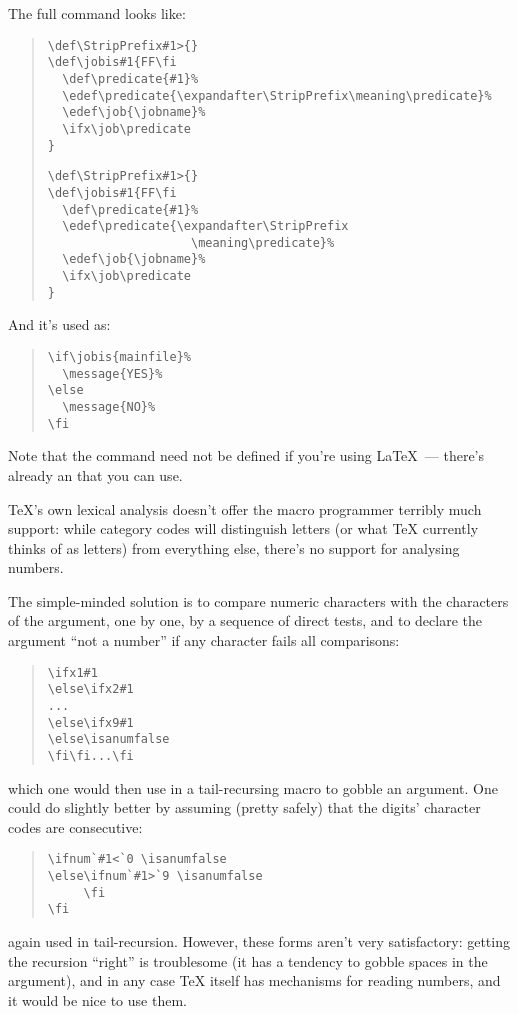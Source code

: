 The full command looks like:
\begin{quote}
\begin{wideversion}
\begin{verbatim}
\def\StripPrefix#1>{}
\def\jobis#1{FF\fi
  \def\predicate{#1}%
  \edef\predicate{\expandafter\StripPrefix\meaning\predicate}%
  \edef\job{\jobname}%
  \ifx\job\predicate
}
\end{verbatim}
\end{wideversion}
\begin{narrowversion}
\begin{verbatim}
\def\StripPrefix#1>{}
\def\jobis#1{FF\fi
  \def\predicate{#1}%
  \edef\predicate{\expandafter\StripPrefix
                    \meaning\predicate}%
  \edef\job{\jobname}%
  \ifx\job\predicate
}
\end{verbatim}
\end{narrowversion}
\end{quote}
And it's used as:
\begin{quote}
\begin{verbatim}
\if\jobis{mainfile}%
  \message{YES}%
\else
  \message{NO}%
\fi
\end{verbatim}
\end{quote}
Note that the command  need not be defined if you're
using \LaTeX{}~--- there's already an %
  that you can
use.


\TeX{}'s own lexical analysis doesn't offer the macro programmer
terribly much support: while category codes will distinguish letters
(or what \TeX{} currently thinks of as letters) from everything else,
there's no support for analysing numbers.

The simple-minded solution is to compare numeric characters with the
characters of the argument, one by one, by a sequence of direct tests,
and to declare the argument ``not a number'' if any character fails
all comparisons:
\begin{quote}
\begin{verbatim}
\ifx1#1
\else\ifx2#1
...
\else\ifx9#1
\else\isanumfalse
\fi\fi...\fi
\end{verbatim}
\end{quote}
which one would then use in a tail-recursing macro to gobble an
argument.  One could do slightly better by assuming (pretty safely)
that the digits' character codes are consecutive:
\begin{quote}
\begin{verbatim}
\ifnum`#1<`0 \isanumfalse
\else\ifnum`#1>`9 \isanumfalse
     \fi
\fi
\end{verbatim}
\end{quote}
again used in tail-recursion.  However, these forms aren't very
satisfactory: getting the recursion ``right'' is troublesome (it has a
tendency to gobble spaces in the argument), and in any case \TeX{}
itself has mechanisms for reading numbers, and it would be nice to use
them.

